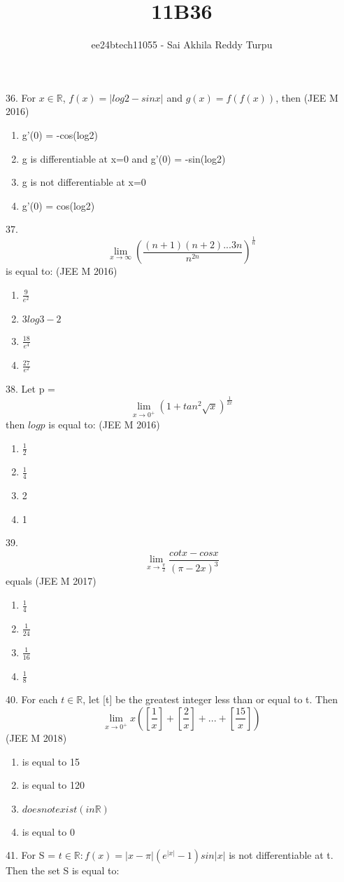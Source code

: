 \documentclass[journal,12pt,twocolumn]{IEEEtran}
\theoremstyle{remark}
\begin{document}

\vspace{3cm}

\title{11B36}
\author{ee24btech11055 - Sai Akhila Reddy Turpu}
\maketitle
\newpage
\bigskip

\renewcommand{\thefigure}{\theenumi}
\renewcommand{\thetable}{\theenumi}
36. For $x\in\mathbb{R}$, $f(x)=|log2-sinx|$ and 
$g(x)=f(f(x))$, then 
\hfill{(JEE M 2016)}
\begin{enumerate}[label=(\alph*)]
\item g'(0) = -cos(log2)
\item g is differentiable at x=0 and g'(0) = -sin(log2)
\item g is not differentiable at x=0
\item g'(0) =  cos(log2)
\end{enumerate}
37. \[\lim_{x\to\infty} \left(\frac{(n+1)(n+2)...3n}{n^{2n}}\right)^{\frac{1}{n}} \] is equal to:
\hfill{(JEE M 2016)}
\begin{enumerate}[label=(\alph*)]
\item $\frac{9}{e^2}$
\item $3log3-2$
\item $\frac{18}{e^4}$
\item $\frac{27}{e^2}$
\end{enumerate}
38. Let p = \[\lim_{x\to0^+} \left(1+tan^2\sqrt{x}\right)^{\frac{1}{2x}} \] then $logp$ is equal to:
\hfill{(JEE M 2016)}
\begin{enumerate}[label=(\alph*)]
\item $\frac{1}{2}$
\item $\frac{1}{4}$
\item 2
\item 1
\end{enumerate}
39. \[\lim_{x\to\frac{\pi}{2}} \frac{cotx-cosx}{(\pi -2x)^3} \] equals 
\hfill{(JEE M 2017)}
\begin{enumerate}[label=(\alph*)]
\item $\frac{1}{4}$
\item $\frac{1}{24}$
\item $\frac{1}{16}$
\item $\frac{1}{8}$
\end{enumerate}
40. For each $t\in\mathbb{R}$, let [t] be the greatest integer less than or equal to t. Then 
\[\lim_{x\to0^+} x\left(\left[\frac{1}{x}\right]+\left[ \frac{2}{x}\right]+...+\left[ \frac{15}{x}\right]\right) \]
\hfill{(JEE M 2018)}
\begin{enumerate}[label=(\alph*)]
\item is equal to 15
\item is equal to 120
\item $does not exist(in \mathbb{R})$
\item is equal to 0
\end{enumerate}
41. For S =  $t\in\mathbb{R}:f(x)=|x-\pi|(e^{|x|}-1)sin|x|$ is not differentiable at t. Then the set S is equal to:
\end{document}
